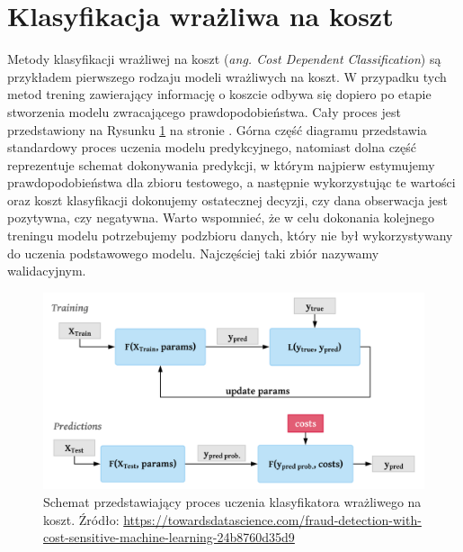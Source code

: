 \documentclass[inzynierska]{pwr_wmat_praca_dyplomowa}
\theoremstyle{plain}
\numberwithin{theorem}{chapter}
\theoremstyle{definition}
\numberwithin{theorem}{chapter}
\begin{document}
\section{Klasyfikacja wrażliwa na koszt}
Metody klasyfikacji wrażliwej na koszt (\textit{ang. Cost Dependent Classification})  są przykładem pierwszego rodzaju modeli wrażliwych na koszt. W przypadku tych metod trening zawierający informację o koszcie odbywa się dopiero po etapie stworzenia modelu zwracającego prawdopodobieństwa. Cały proces jest przedstawiony na Rysunku \ref{cdc} na stronie \pageref{cdc}. Górna część diagramu przedstawia standardowy proces uczenia modelu predykcyjnego, natomiast dolna część reprezentuje schemat dokonywania predykcji, w którym najpierw estymujemy prawdopodobieństwa dla zbioru testowego, a następnie wykorzystując te wartości oraz koszt klasyfikacji dokonujemy ostatecznej decyzji, czy dana obserwacja jest pozytywna, czy negatywna. Warto wspomnieć, że w celu dokonania kolejnego treningu modelu potrzebujemy podzbioru danych, który nie był wykorzystywany do uczenia podstawowego modelu. Najczęściej taki zbiór nazywamy walidacyjnym.
\begin{figure}
	\includegraphics[width=\linewidth]{images/cost_sensitive_classification.png}
	\caption{Schemat przedstawiający proces uczenia klasyfikatora wrażliwego na koszt. Źródło: \url{https://towardsdatascience.com/fraud-detection-with-cost-sensitive-machine-learning-24b8760d35d9}}
	\label{cdc}
\end{figure}
\end{document}
